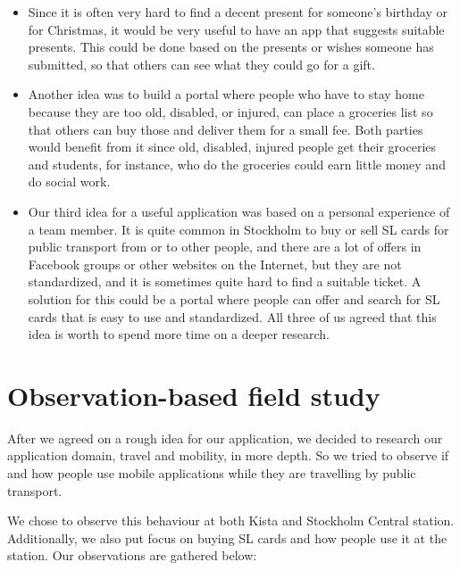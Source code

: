\documentclass[11pt,twoside,a4paper]{report}
\begin{document}
\begin{itemize}
\item Since it is often very hard to find a decent present for someone's birthday or for Christmas, it would be very useful to have an app that suggests suitable presents. This could be done based on the presents or wishes someone has submitted, so that others can see what they could go for a gift.
\item Another idea was to build a portal where people who have to stay home because they are too old, disabled, or injured, can place a groceries list so that others can buy those and deliver them for a small fee. Both parties would benefit from it since old, disabled, injured people get their groceries and students, for instance, who do the groceries could earn little money and do social work.
\item Our third idea for a useful application was based on a personal experience of a team member. It is quite common in Stockholm to buy or sell SL cards for public transport from or to other people, and there are a lot of offers in Facebook groups or other websites on the Internet, but they are not standardized, and it is sometimes quite hard to find a suitable ticket. A solution for this could be a portal where people can offer and search for SL cards that is easy to use and standardized. All three of us agreed that this idea is worth to spend more time on a deeper research.
\end{itemize}

\section{Observation-based field study}

After we agreed on a rough idea for our application, we decided to research our application domain, travel and mobility, in more depth. So we tried to observe if and how people use mobile applications while they are travelling by public transport.

We chose to observe this behaviour at both Kista and Stockholm Central station. Additionally, we also put focus on buying SL cards and how people use it at the station. Our observations are gathered below:
\end{document}

